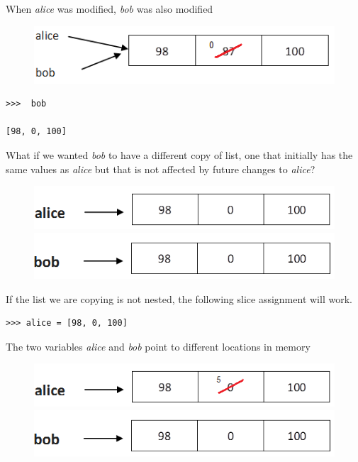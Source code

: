 \documentclass{article}
\begin{document}
When \textit{alice} was modified, \textit{bob} was also modified\\

\begin{figure}[h]
\includegraphics[scale=.81]{alice_bob_modified}\\
\end{figure}


\begin{lstlisting}
>>>  bob                                      

[98, 0, 100]

\end{lstlisting}

What if we wanted \textit{bob} to have a different copy of list, one that initially has the same values as \textit{alice} but that is not affected by future changes to \textit{alice}?

\begin{figure}[h]
\includegraphics[scale=.545]{alice_different}
\includegraphics[scale=.5]{bob_different}\\
\end{figure}

If the list we are copying is not nested, the following slice assignment will work.

\begin{lstlisting}
>>> alice = [98, 0, 100]                    

\end{lstlisting}

The two variables \textit{alice} and \textit{bob} point to different locations in memory

\begin{figure}[h]
\includegraphics[scale=.745]{alice_different_modified}\\
\includegraphics[scale=.51]{bob_different}\\
\end{figure}
\end{document}
